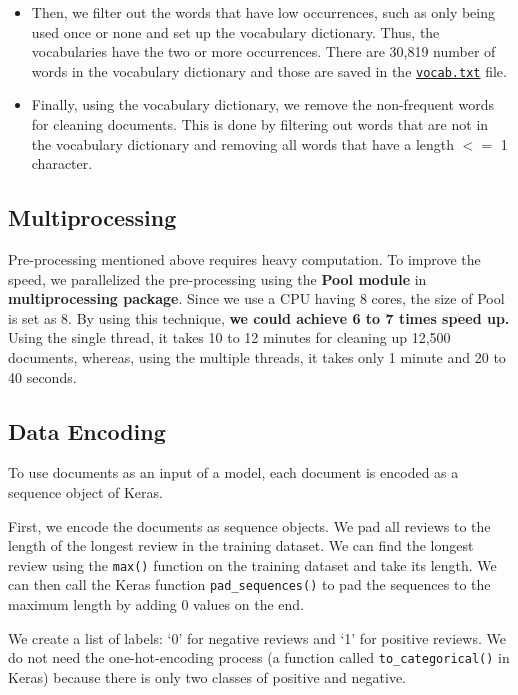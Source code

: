 \documentclass[11pt]{article}
\begin{document}
\begin{enumerate}
\begin{itemize}
\item Then, we filter out the words that have low occurrences, such as only being used once or none and set up the vocabulary dictionary. Thus, the vocabularies have the two or more occurrences. There are 30,819 number of words in the vocabulary dictionary and those are saved in the \href{https://github.com/ahrimhan/data-science-project/tree/master/project2/vocab/vocab.txt}{\texttt{vocab.txt}} file.

\item
Finally, using the vocabulary dictionary, we remove the non-frequent words for cleaning documents. This is done by filtering out words that are not in the vocabulary dictionary and removing all words that have a length $<=$ 1 character.
\end{itemize}

\end{enumerate}

\subsection{Multiprocessing}
Pre-processing mentioned above requires heavy computation. 
To improve the speed, we parallelized the pre-processing using the \textbf{Pool module} in \textbf{multiprocessing package}.
Since we use a CPU having 8 cores, the size of Pool is set as 8.
By using this technique, \textbf{we could achieve 6 to 7 times speed up.} 
Using the single thread, it takes 10 to 12 minutes for cleaning up 12,500 documents, whereas, using the multiple threads, it takes only 1 minute and 20 to 40 seconds.

\subsection{Data Encoding}


To use documents as an input of a model, each document is encoded as a sequence object of Keras.

First, we encode the documents as sequence objects.
We pad all reviews to the length of the longest review in the training dataset.
We can find the longest review using the \texttt{max()} function on the training dataset and take its length. 
We can then call the Keras function \texttt{pad\_sequences()} to pad the sequences to the maximum length by adding 0 values on the end.

We create a list of labels: `0' for negative reviews and `1' for positive reviews.
We do not need the one-hot-encoding process (a function called \texttt{to\_categorical()} in Keras) because there is only two classes of positive and negative.
\end{document}
